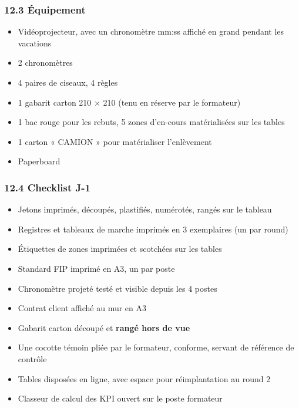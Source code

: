 \documentclass[
]{article}
\providecommand{\tightlist}{%
  \setlength{\itemsep}{0pt}\setlength{\parskip}{0pt}}
\begin{document}
\subsubsection{12.3 Équipement}\label{uxe9quipement}

\begin{itemize}
\tightlist
\item
  Vidéoprojecteur, avec un chronomètre mm:ss affiché en grand pendant
  les vacations
\item
  2 chronomètres
\item
  4 paires de ciseaux, 4 règles
\item
  1 gabarit carton 210 × 210 (tenu en réserve par le formateur)
\item
  1 bac rouge pour les rebuts, 5 zones d'en-cours matérialisées sur les
  tables
\item
  1 carton « CAMION » pour matérialiser l'enlèvement
\item
  Paperboard
\end{itemize}

\subsubsection{12.4 Checklist J-1}\label{checklist-j-1}

\begin{itemize}
\tightlist
\item[$\square$]
  Jetons imprimés, découpés, plastifiés, numérotés, rangés sur le
  tableau
\item[$\square$]
  Registres et tableaux de marche imprimés en 3 exemplaires (un par
  round)
\item[$\square$]
  Étiquettes de zones imprimées et scotchées sur les tables
\item[$\square$]
  Standard FIP imprimé en A3, un par poste
\item[$\square$]
  Chronomètre projeté testé et visible depuis les 4 postes
\item[$\square$]
  Contrat client affiché au mur en A3
\item[$\square$]
  Gabarit carton découpé et \textbf{rangé hors de vue}
\item[$\square$]
  Une cocotte témoin pliée par le formateur, conforme, servant de
  référence de contrôle
\item[$\square$]
  Tables disposées en ligne, avec espace pour réimplantation au round 2
\item[$\square$]
  Classeur de calcul des KPI ouvert sur le poste formateur
\end{itemize}
\end{document}
